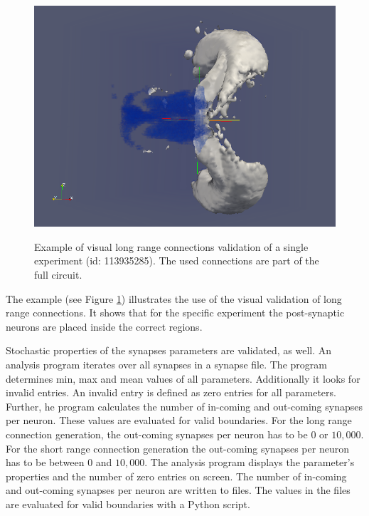\begin{figure}[ht!]
\begin{center}
{            \includegraphics[scale=0.15]{pictures/exp1_post_contour.png}
       }
    \end{center}
    	\caption[Example of visual long range connections validation of a single experiment]{%
        Example of visual long range connections validation of a single experiment (id: 113935285).
        The used connections are part of the full circuit.
     }%
   \label{fig:longrangevalidation}
   \end{figure}
   
The example (see Figure \ref{fig:longrangevalidation}) illustrates the use of the visual validation of long range connections.
It shows that for the specific experiment the post-synaptic neurons are placed inside the correct regions.

Stochastic properties of the synapses parameters are validated, as well.
An analysis program iterates over all synapses in a synapse file.
The program determines min, max and mean values of all parameters.
Additionally it looks for invalid entries. An invalid entry is defined as
zero entries for all parameters. Further, he program calculates the number of in-coming
and out-coming synapses per neuron. These values are evaluated for valid boundaries.
For the long range connection generation, the out-coming synapses per neuron has to be
$0$ or $10,000$. For the short range connection generation the out-coming synapses per neuron
has to be between $0$ and $10,000$. The analysis program displays the parameter’s properties
and the number of zero entries on screen. The number of in-coming and out-coming 
synapses per neuron are written to files.
The values in the files are evaluated for valid boundaries with a Python script.



